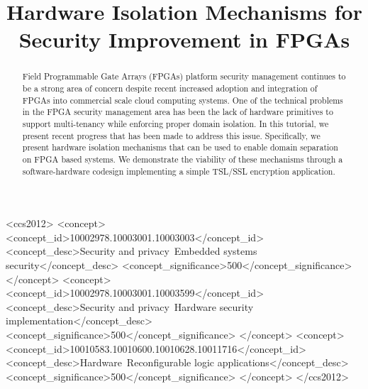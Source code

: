 \documentclass[sigconf]{acmart}
\theoremstyle{plain}
\theoremstyle{remark}
\begin{document}
\title{Hardware Isolation Mechanisms for Security Improvement in FPGAs}
%
%
%
%


\begin{abstract}
Field Programmable Gate Arrays (FPGAs) platform security management continues to be a strong area of concern despite recent increased adoption and integration of FPGAs into commercial scale cloud computing systems. One of the technical problems in the FPGA security management area has been the lack of hardware primitives to support multi-tenancy while enforcing proper domain isolation. In this tutorial, we present recent progress that has been made to address this issue. Specifically, we present hardware isolation mechanisms that can be used to enable domain separation on FPGA based systems. We demonstrate the viability of these mechanisms through a software-hardware codesign implementing a simple TSL/SSL encryption application.
\end{abstract}


\begin{CCSXML}
<ccs2012>
<concept>
<concept_id>10002978.10003001.10003003</concept_id>
<concept_desc>Security and privacy~Embedded systems security</concept_desc>
<concept_significance>500</concept_significance>
</concept>
<concept>
<concept_id>10002978.10003001.10003599</concept_id>
<concept_desc>Security and privacy~Hardware security implementation</concept_desc>
<concept_significance>500</concept_significance>
</concept>
<concept>
<concept_id>10010583.10010600.10010628.10011716</concept_id>
<concept_desc>Hardware~Reconfigurable logic applications</concept_desc>
<concept_significance>500</concept_significance>
</concept>
</ccs2012>
\end{CCSXML}

\end{document}
